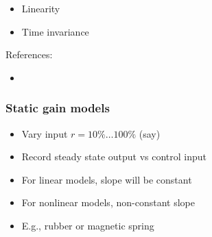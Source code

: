 \documentclass[10pt]{beamer-control}
\begin{document}

\begin{SUMMARY}
\begin{itemize}
\item Linearity
\item Time invariance
\end{itemize}
\vfill References:
\begin{itemize}
\item \astrom[§6.1]
\end{itemize}
\end{SUMMARY}




\begin{frame}
\frametitle{Static gain models}
\begin{itemize}
\item Vary input $r=10\%\dots100\%$ (say)
\item Record steady state output vs control input
\item For linear models, slope will be constant
\item For nonlinear models, non-constant slope
\item E.g., rubber or magnetic spring
\end{itemize}
\end{frame}
\end{document}
